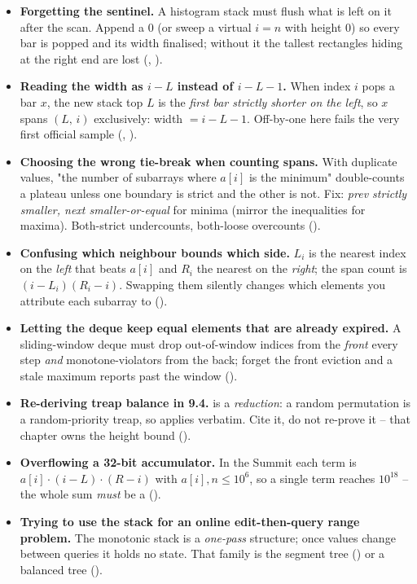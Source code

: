 \begin{itemize}[nosep, leftmargin=1.4em]
  \item \textbf{Forgetting the sentinel.} A histogram stack must flush what is left on it after the scan.
        Append a $0$ (or sweep a virtual $i=n$ with height $0$) so every bar is popped and its width
        finalised; without it the tallest rectangles hiding at the right end are lost (,
        ).
  \item \textbf{Reading the width as $i-L$ instead of $i-L-1$.} When index $i$ pops a bar $x$, the new
        stack top $L$ is the \emph{first bar strictly shorter on the left}, so $x$ spans
        $(L,\,i)$ exclusively: width $=i-L-1$. Off-by-one here fails the very first official sample
        (, ).
  \item \textbf{Choosing the wrong tie-break when counting spans.} With duplicate values, "the number of
        subarrays where $a[i]$ is the minimum" double-counts a plateau unless one boundary is strict and
        the other is not. Fix: \emph{prev strictly smaller, next smaller-or-equal} for minima (mirror the
        inequalities for maxima). Both-strict undercounts, both-loose overcounts ().
  \item \textbf{Confusing which neighbour bounds which side.} $L_i$ is the nearest index on the \emph{left}
        that beats $a[i]$ and $R_i$ the nearest on the \emph{right}; the span count is $(i-L_i)(R_i-i)$.
        Swapping them silently changes which elements you attribute each subarray to ().
  \item \textbf{Letting the deque keep equal elements that are already expired.} A sliding-window deque
        must drop out-of-window indices from the \emph{front} every step \emph{and} monotone-violators from
        the back; forget the front eviction and a stale maximum reports past the window ().
  \item \textbf{Re-deriving treap balance in 9.4.}  is a \emph{reduction}: a random
        permutation is a random-priority treap, so  applies verbatim. Cite it, do
        not re-prove it -- that chapter owns the height bound ().
  \item \textbf{Overflowing a 32-bit accumulator.} In the Summit each term is $a[i]\cdot(i-L)\cdot(R-i)$
        with $a[i],n\le 10^{6}$, so a single term reaches $10^{18}$ -- the whole sum \emph{must} be a
         ().
  \item \textbf{Trying to use the stack for an online edit-then-query range problem.} The monotonic stack is
        a \emph{one-pass} structure; once values change between queries it holds no state. That family is
        the segment tree () or a balanced tree ().
\end{itemize}

